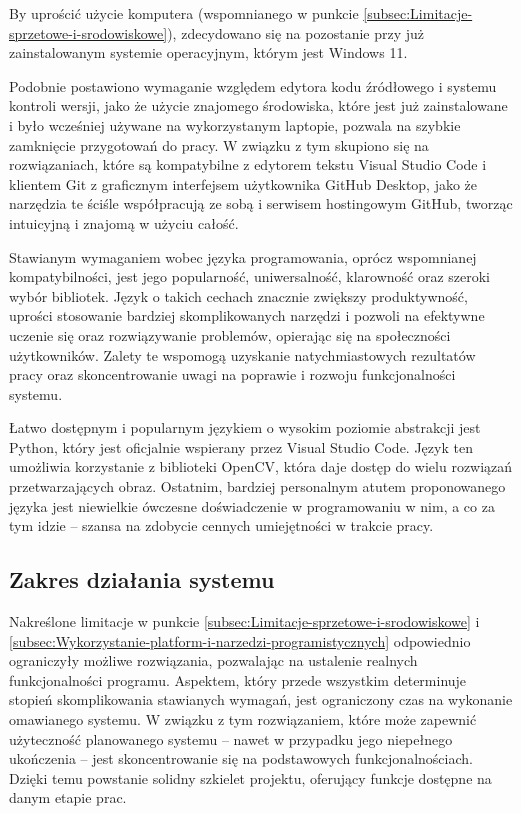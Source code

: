 \documentclass[a4paper,twoside,12pt]{book}
\begin{document}
By uprościć użycie komputera (wspomnianego w punkcie \ref{subsec:Limitacje-sprzetowe-i-srodowiskowe}), zdecydowano się na pozostanie przy już zainstalowanym systemie operacyjnym, którym jest Windows 11.

Podobnie postawiono wymaganie względem edytora kodu źródłowego i systemu kontroli wersji, jako że użycie znajomego środowiska, które jest już zainstalowane i było wcześniej używane na wykorzystanym laptopie, pozwala na szybkie zamknięcie przygotowań do pracy. W związku z tym skupiono się na rozwiązaniach, które są kompatybilne z edytorem tekstu Visual Studio Code i klientem Git z graficznym interfejsem użytkownika GitHub Desktop, jako że narzędzia te ściśle współpracują ze sobą i serwisem hostingowym GitHub, tworząc intuicyjną i znajomą w użyciu całość.

Stawianym wymaganiem wobec języka programowania, oprócz wspomnianej kompatybilności, jest jego popularność, uniwersalność, klarowność oraz szeroki wybór bibliotek. Język o takich cechach znacznie zwiększy produktywność, uprości stosowanie bardziej skomplikowanych narzędzi i pozwoli na efektywne uczenie się oraz rozwiązywanie problemów, opierając się na społeczności użytkowników. Zalety te wspomogą uzyskanie natychmiastowych rezultatów pracy oraz skoncentrowanie uwagi na poprawie i rozwoju funkcjonalności systemu.

Łatwo dostępnym i popularnym językiem o wysokim poziomie abstrakcji jest Python, który jest oficjalnie wspierany przez Visual Studio Code. Język ten umożliwia korzystanie z biblioteki OpenCV, która daje dostęp do wielu rozwiązań przetwarzających obraz. Ostatnim, bardziej personalnym atutem proponowanego języka jest niewielkie ówczesne doświadczenie w programowaniu w nim, a co za tym idzie -- szansa na zdobycie cennych umiejętności w trakcie pracy.

\subsection{Zakres działania systemu}
\label{subsec:zakres-dzialania-systemu}

Nakreślone limitacje w punkcie \ref{subsec:Limitacje-sprzetowe-i-srodowiskowe} i \ref{subsec:Wykorzystanie-platform-i-narzedzi-programistycznych} odpowiednio ograniczyły możliwe rozwiązania, pozwalając na ustalenie realnych funkcjonalności programu. Aspektem, który przede wszystkim determinuje stopień skomplikowania stawianych wymagań, jest ograniczony czas na wykonanie omawianego systemu. W związku z tym rozwiązaniem, które może zapewnić użyteczność planowanego systemu -- nawet w przypadku jego niepełnego ukończenia -- jest skoncentrowanie się na podstawowych funkcjonalnościach. Dzięki temu powstanie solidny szkielet projektu, oferujący funkcje dostępne na danym etapie prac.
\end{document}

